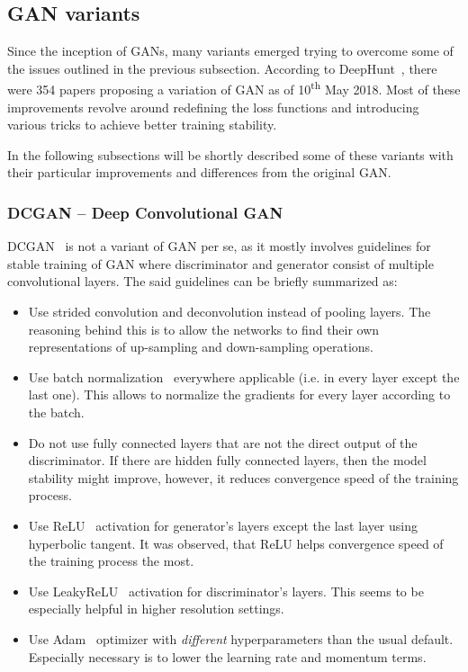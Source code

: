 \subsection{GAN variants}

Since the inception of GANs, many variants emerged trying to overcome some of the issues outlined in the previous subsection. According to DeepHunt~\cite{deephunt}, there were 354 papers proposing a variation of GAN as of 10\textsuperscript{th} May 2018. Most of these improvements revolve around redefining the loss functions and introducing various tricks to achieve better training stability.

In the following subsections will be shortly described some of these variants with their particular improvements and differences from the original GAN.

\subsubsection{DCGAN -- Deep Convolutional GAN}
DCGAN~\cite{dcgan} is not a variant of GAN per se, as it mostly involves guidelines for stable training of GAN where discriminator and generator consist of multiple convolutional layers. The said guidelines can be briefly summarized as:
\begin{itemize}
\item Use strided convolution and deconvolution instead of pooling layers. The reasoning behind this is to allow the networks to find their own representations of up-sampling and down-sampling operations.
\item Use batch normalization~\cite{batchnorm} everywhere applicable (i.e. in every layer except the last one). This allows to normalize the gradients for every layer according to the batch.
\item Do not use fully connected layers that are not the direct output of the discriminator. If there are hidden fully connected layers, then the model stability might improve, however, it reduces convergence speed of the training process.
\item Use ReLU~\cite{relu} activation for generator's layers except the last layer using hyperbolic tangent. It was observed, that ReLU helps convergence speed of the training process the most.
\item Use LeakyReLU~\cite{leakyrelu} activation for discriminator's layers. This seems to be especially helpful in higher resolution settings.
\item Use Adam~\cite{adam} optimizer with {\em different} hyperparameters than the usual default. Especially necessary is to lower the learning rate and momentum terms.
\end{itemize}

